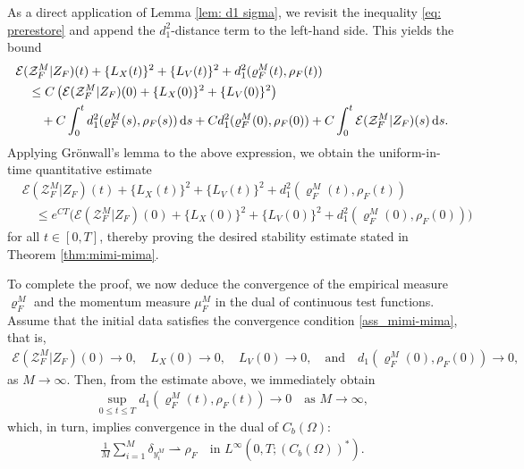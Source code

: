 \documentclass[10pt, reqno]{amsart}
\theoremstyle{definition}
\theoremstyle{remark}
\numberwithin{equation}{section}
\newcommand{\ds}{\textnormal{d}s}
\newcommand{\calE}{\mathcal E}
\newcommand{\calZ}{\mathcal Z}
\newcommand{\weakto}{\rightharpoonup}
\begin{document}
As a direct application of Lemma \ref{lem: d1 sigma}, we revisit the inequality \eqref{eq: prerestore} and append the $d_1^2$-distance term to the left-hand side. This yields the bound
\begin{align*}
    &\calE(\calZ_F^M| Z_F)(t) + \{L_X(t)\}^2 + \{L_V(t)\}^2 + d_{1}^2(\varrho_F^M(t),\rho_F(t))  \\
    &\quad \le C \left(\calE(\calZ_F^M| Z_F)(0) + \{L_X(0)\}^2 + \{L_V(0)\}^2\right) \\
    &\qquad + C \int_0^t d_1^2(\varrho_F^M(s),\rho_F(s)) \,\ds + Cd_1^2(\varrho_F^M(0) ,\rho_F(0)) + C\int_0^t \calE(\calZ_F^M| Z_F)(s)\,\ds .
\end{align*}
Applying Gr\"onwall's lemma to the above expression, we obtain the uniform-in-time quantitative estimate
\begin{align*}
    &\calE(\calZ_F^M| Z_F)(t) + \{L_X(t)\}^2 + \{L_V(t)\}^2 + d_1^2(\varrho_F^M(t),\rho_F(t))  \\
    &\quad \le e^{CT}\Big(\calE(\calZ_F^M|Z_F)(0) + \{L_X(0)\}^2 + \{L_V(0)\}^2 + d_1^2(\varrho_F^M(0),\rho_F(0)) \Big)
\end{align*}
for all $t \in [0,T]$, thereby proving the desired stability estimate stated in Theorem \ref{thm:mimi-mima}.

To complete the proof, we now deduce the convergence of the empirical measure $\varrho_F^M$ and the momentum measure $\mu_F^{M}$ in the dual of continuous test functions. Assume that the initial data satisfies the convergence condition \eqref{ass_mimi-mima}, that is,
\begin{align*}
    \calE(\calZ_F^M|Z_F)(0) \to 0, \quad L_X(0) \to 0, \quad L_V(0) \to 0, \quad \text{and} \quad d_1(\varrho_F^M(0), \rho_F(0)) \to 0,
\end{align*}
as $M \to \infty$. Then, from the estimate above, we immediately obtain
\begin{align*}
    \sup_{0\le t \le T} d_1\left(\varrho_F^M(t), \rho_F(t)\right) \to 0 \quad \text{as } M \to \infty,
\end{align*}
which, in turn, implies convergence in the dual of $C_b(\Omega)$:
\begin{align*}
    \frac{1}{M}\sum_{i=1}^M \delta_{y_i^{M}} \weakto \rho_F \quad \text{in } L^\infty(0,T; (C_b(\Omega))^*).
\end{align*}
\end{document}
